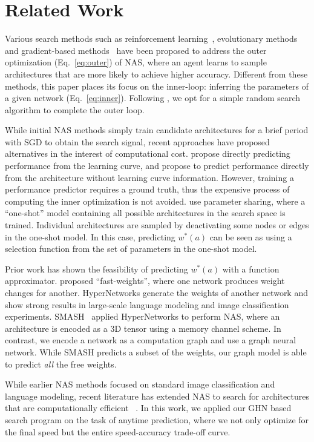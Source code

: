\section{Related Work}
Various search methods such as reinforcement learning~\citep{zoph2016neural,
baker2016designing,zoph2017learning}, evolutionary
methods~\citep{real2017large,miikkulainen2017evolving,xie2017genetic,liu2017hierarchical,real2018regularized}
and gradient-based methods~\citep{liu2018darts,luo2018neural} have been proposed to address the
outer optimization (Eq.~\ref{eq:outer}) of NAS, where an agent learns to sample architectures that
are more likely to achieve higher accuracy. Different from these methods, this paper places its
focus on the inner-loop: inferring the parameters of a given network (Eq.~\ref{eq:inner}). Following
\cite{brock2017smash,bender2018understanding}, we opt for a simple random search algorithm to
complete the outer loop.

While initial NAS methods simply train candidate architectures for a brief period with SGD to obtain
the search signal, recent approaches have proposed alternatives in the interest of computational
cost. \cite{baker2017accelerating} propose directly predicting performance from the learning curve,
and \cite{deng2017peephole} propose to predict performance directly from the architecture without
learning curve information. However, training a performance predictor requires a ground truth, thus
the expensive process of computing the inner optimization is not avoided.
\cite{pham2018efficient,bender2018understanding,liu2018darts} use parameter sharing, where a
``one-shot'' model containing all possible architectures in the search space is trained. Individual
architectures are sampled by deactivating some nodes or edges in the one-shot model. In this case,
predicting $w^*(a)$ can be seen as using a selection function from the set of parameters in the
one-shot model.

Prior work has shown the feasibility of predicting $w^*(a)$ with a function approximator.
\cite{Schmidhuber92Learning,schmidhuber1993self} proposed ``fast-weights'', where one network
produces weight changes for another. HyperNetworks \citep{ha2016hypernetworks} generate the weights
of another network and show strong results in large-scale language modeling and image classification
experiments. SMASH~\citep{brock2017smash} applied HyperNetworks to perform NAS, where an
architecture is encoded as a 3D tensor using a memory channel scheme. In contrast, we encode a
network as a computation graph and use a graph neural network. While SMASH predicts a subset of the
weights, our graph model is able to predict \textit{all} the free weights.

While earlier NAS methods focused on standard image classification and language modeling, recent
literature has extended NAS to search for architectures that are computationally efficient
~\citep{tan2018mnasnet,dong2018dpp,hsu2018monas,elsken2018multi,zhou2018resource}. In this work, we
applied our GHN based search program on the task of anytime prediction, where we not only optimize
for the final speed but the entire speed-accuracy trade-off curve.
